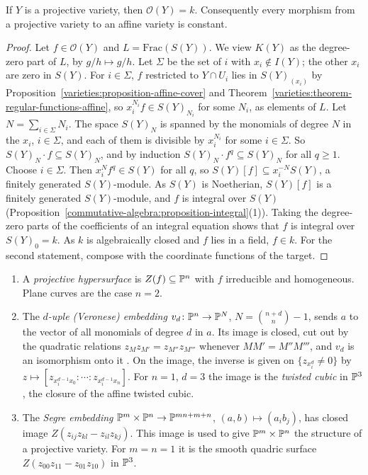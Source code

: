\begin{theorem}\label{varieties:theorem-projective-constant}
If $Y$ is a projective variety, then $\mathcal{O}(Y) = k$. Consequently every morphism from a projective variety to an affine variety is
constant.
\end{theorem}

\begin{proof}
Let $f \in \mathcal{O}(Y)$ and $L = \mathrm{Frac}(S(Y))$. We view $K(Y)$ as the degree-zero part of $L$, by $g/h \mapsto g/h$. Let $\Sigma$ be the set of $i$ with $x_i \notin I(Y)$;
the other $x_i$ are zero in $S(Y)$. For $i \in \Sigma$, $f$ restricted to $Y \cap U_i$ lies in $S(Y)_{(x_i)}$ by
Proposition~\ref{varieties:proposition-affine-cover} and Theorem~\ref{varieties:theorem-regular-functions-affine}, so $x_i^{N_i}f \in S(Y)_{N_i}$ for
some $N_i$, as elements of $L$. Let $N = \sum_{i \in \Sigma}N_i$. The space $S(Y)_N$ is spanned by the monomials of degree $N$ in the $x_i$, $i \in \Sigma$,
and each of them is divisible by $x_i^{N_i}$ for some $i \in \Sigma$. So $S(Y)_N \cdot f \subseteq S(Y)_N$, and by induction
$S(Y)_N \cdot f^q \subseteq S(Y)_N$ for all $q \geq 1$. Choose $i \in \Sigma$. Then
$x_i^Nf^q \in S(Y)$ for all $q$, so $S(Y)[f] \subseteq x_i^{-N}S(Y)$, a finitely generated $S(Y)$-module. As $S(Y)$ is Noetherian, $S(Y)[f]$ is
a finitely generated $S(Y)$-module, and $f$ is integral over $S(Y)$ (Proposition~\ref{commutative-algebra:proposition-integral}(1)). Taking the
degree-zero parts of the coefficients of an integral equation shows that $f$ is integral over $S(Y)_0 = k$. As $k$ is algebraically closed and
$f$ lies in a field, $f \in k$. For the second statement, compose with the coordinate functions of the target.
\end{proof}

\begin{example}\label{varieties:example-projective}
\begin{enumerate}
\item A \emph{projective hypersurface} is $Z(f) \subseteq \mathbb{P}^n$ with $f$ irreducible and homogeneous. Plane curves are the case $n = 2$.
\item The \emph{$d$-uple (Veronese) embedding} $v_d \colon \mathbb{P}^n \to \mathbb{P}^N$, $N = \binom{n+d}{n} - 1$, sends $a$ to the vector of all monomials of degree
$d$ in $a$. Its image is closed, cut out by the quadratic relations $z_Mz_{M'} = z_{M''}z_{M'''}$ whenever $MM' = M''M'''$, and $v_d$ is an isomorphism
onto it \cite[Chapter I, Exercises 2.12 and 3.4]{hartshorne-ag}. On the image, the inverse is given on $\{z_{x_i^d} \neq 0\}$ by
$z \mapsto [z_{x_i^{d-1}x_0} : \cdots : z_{x_i^{d-1}x_n}]$. For $n = 1$, $d = 3$ the image is the \emph{twisted cubic} in $\mathbb{P}^3$, the closure of the affine twisted cubic.
\item The \emph{Segre embedding} $\mathbb{P}^m \times \mathbb{P}^n \to \mathbb{P}^{mn+m+n}$, $(a, b) \mapsto (a_ib_j)$, has closed image $Z(z_{ij}z_{kl} - z_{il}z_{kj})$. This image
is used to give $\mathbb{P}^m \times \mathbb{P}^n$ the structure of a projective variety. For $m = n = 1$ it is the smooth quadric surface $Z(z_{00}z_{11} - z_{01}z_{10})$
in $\mathbb{P}^3$.
\end{enumerate}
\end{example}

